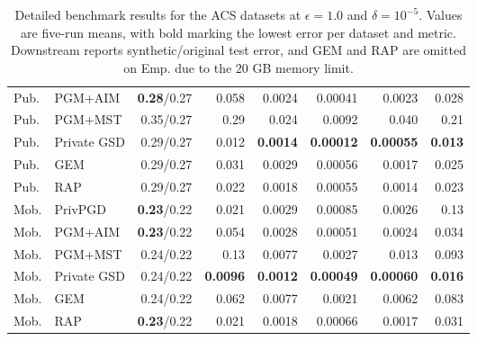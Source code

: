 \begin{table}[!tbp]
{\begin{tabular}{llrrrrrr}
    Pub. & PGM+AIM & \textbf{0.28}/0.27 & 0.058 & 0.0024 & 0.00041 & 0.0023 & 0.028 \\
    Pub. & PGM+MST & 0.35/0.27 & 0.29 & 0.024 & 0.0092 & 0.040 & 0.21 \\
    Pub. & Private GSD & 0.29/0.27 & 0.012 & \textbf{0.0014} & \textbf{0.00012} & \textbf{0.00055} & \textbf{0.013} \\
    Pub. & GEM & 0.29/0.27 & 0.031 & 0.0029 & 0.00056 & 0.0017 & 0.025 \\
    Pub. & RAP & 0.29/0.27 & 0.022 & 0.0018 & 0.00055 & 0.0014 & 0.023 \\
    \midrule
    Mob. & PrivPGD & \textbf{0.23}/0.22 & 0.021 & 0.0029 & 0.00085 & 0.0026 & 0.13 \\
    Mob. & PGM+AIM & \textbf{0.23}/0.22 & 0.054 & 0.0028 & 0.00051 & 0.0024 & 0.034 \\
    Mob. & PGM+MST & 0.24/0.22 & 0.13 & 0.0077 & 0.0027 & 0.013 & 0.093 \\
    Mob. & Private GSD & 0.24/0.22 & \textbf{0.0096} & \textbf{0.0012} & \textbf{0.00049} & \textbf{0.00060} & \textbf{0.016} \\
    Mob. & GEM & 0.24/0.22 & 0.062 & 0.0077 & 0.0021 & 0.0062 & 0.083 \\
    Mob. & RAP & \textbf{0.23}/0.22 & 0.021 & 0.0018 & 0.00066 & 0.0017 & 0.031 \\
    \bottomrule
  \end{tabular}}
  \caption{Detailed benchmark results for the ACS datasets at \(\epsilon = 1.0\) and \(\delta = 10^{-5}\). Values are five-run means, with bold marking the lowest error per dataset and metric. Downstream reports synthetic/original test error, and GEM and RAP are omitted on Emp. due to the \(20\) GB memory limit.}
  \label{tab:app-privpgd-e10-acs}
\end{table}

